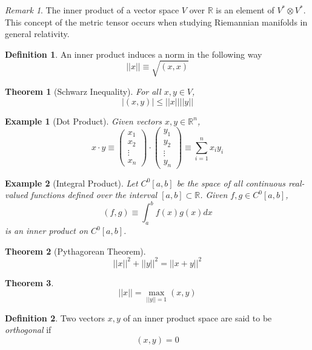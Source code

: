 \documentclass{article}
\newtheorem{theorem}{Theorem}[section]
\newtheorem{example}{Example}[section]
\theoremstyle{remark}
\newtheorem*{remark}{Remark}
\theoremstyle{definition}
\newtheorem{definition}{Definition}[section]
\begin{document}
  \begin{remark}
  The inner product of a vector space $V$ over $\mathbb{R}$ is an element of $V^* \otimes V^*$. This concept of the metric tensor occurs when studying Riemannian manifolds in general relativity. 
  \end{remark}

  \begin{definition}
  An inner product induces a norm in the following way
  \[||x|| \equiv \sqrt{(x,x)} \]
  \end{definition}

  \begin{theorem}[Schwarz Inequality]
  For all $x, y \in V$, 
  \[ |(x, y)| \leq ||x|| ||y||\]
  \end{theorem}

  \begin{example}[Dot Product]
  Given vectors $x, y \in \mathbb{R}^n$, 
  \[ x \cdot y \equiv  \begin{pmatrix}
  x_1\\x_2\\\vdots\\x_n
  \end{pmatrix} \cdot \begin{pmatrix}
  y_1\\y_2\\\vdots\\y_n
  \end{pmatrix} \equiv \sum_{i=1}^n x_i y_i\]
  \end{example}

  \begin{example}[Integral Product]
  Let $C^0[a, b]$ be the space of all continuous real-valued functions defined over the interval $[a,b] \subset \mathbb{R}$. Given $f, g \in C^0[a,b]$, 
  \[(f, g) \equiv \int_a^b f(x)g(x) d x\]
  is an inner product on $C^0[a, b]$. 
  \end{example}

  \begin{theorem}[Pythagorean Theorem]
  \[ ||x||^2 + ||y||^2 = ||x+y||^2\]
  \end{theorem}

  \begin{theorem}
  \[||x|| = \max_{||y||=1} (x, y)\]
  \end{theorem}

  \begin{definition}
  Two vectors $x, y$ of an inner product space are said to be \textit{orthogonal} if 
  \[(x, y) = 0\]
  \end{definition}
\end{document}
